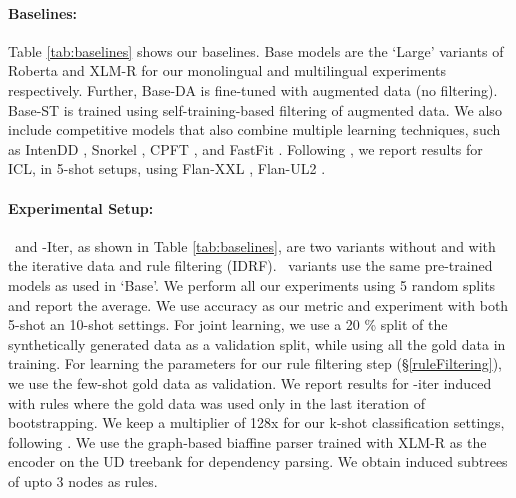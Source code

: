 \paragraph{Baselines:} Table \ref{tab:baselines} shows our baselines. Base models are the `Large' variants of Roberta \cite{liu2019roberta} and XLM-R \cite{conneau-etal-2020-unsupervised} for our monolingual and multilingual experiments respectively. Further, Base-DA is fine-tuned with augmented data (no filtering). Base-ST is trained using self-training-based filtering of augmented data. We also include competitive models that also combine multiple learning techniques, such as IntenDD \cite{singhal-etal-2023-intendd}, Snorkel \cite{DBLP:journals/corr/abs-1711-10160ratner}, CPFT \cite{zhang-etal-2022-contrastive}, and FastFit \cite{yehudai2024llms}. Following \citet{yehudai2024llms}, we report results for ICL, in 5-shot setups, using Flan-XXL \cite{wei2021finetunedflanxxl}, Flan-UL2 \cite{tay2022ul2}. 
 





\paragraph{Experimental Setup:} \our~and \our-Iter, as shown in Table \ref{tab:baselines}, are two variants without and with the iterative data and rule filtering (IDRF). \our~variants use  the same pre-trained models as used in `Base'. We perform all our experiments using 5 random splits and report the average. We use accuracy as our metric and experiment with both 5-shot an 10-shot settings\cite{yehudai2024llms}. For joint learning, we use a 20 \% split of the synthetically generated data as a validation split, while using all the gold data in training. For learning the parameters for our rule filtering step (\S \ref{ruleFiltering}), we use the few-shot gold data as validation. We report results for \our-iter induced with rules where the gold data was used only in the last iteration of bootstrapping. We keep a multiplier of 128x for our k-shot classification settings, following \citet{lin-etal-2023-selective}. %
We use the graph-based biaffine parser \cite{dozat2016deep} trained with XLM-R as the encoder on the UD treebank \cite{11234/1-5150ud} for dependency parsing. We obtain induced subtrees of upto 3 nodes as rules.

